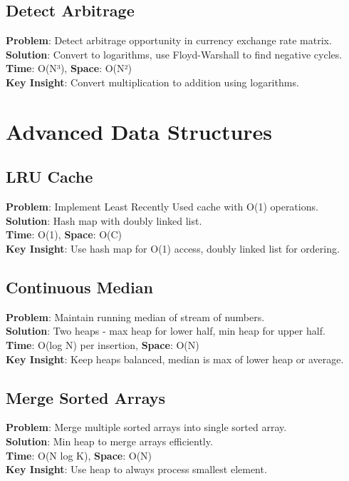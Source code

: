 \documentclass{report}
\begin{document}
\subsection{Detect Arbitrage}
\textbf{Problem}: Detect arbitrage opportunity in currency exchange rate matrix.\\
\textbf{Solution}: Convert to logarithms, use Floyd-Warshall to find negative cycles.\\
\textbf{Time}: O(N³), \textbf{Space}: O(N²)\\
\textbf{Key Insight}: Convert multiplication to addition using logarithms.

\section{Advanced Data Structures}

\subsection{LRU Cache}
\textbf{Problem}: Implement Least Recently Used cache with O(1) operations.\\
\textbf{Solution}: Hash map with doubly linked list.\\
\textbf{Time}: O(1), \textbf{Space}: O(C)\\
\textbf{Key Insight}: Use hash map for O(1) access, doubly linked list for ordering.

\subsection{Continuous Median}
\textbf{Problem}: Maintain running median of stream of numbers.\\
\textbf{Solution}: Two heaps - max heap for lower half, min heap for upper half.\\
\textbf{Time}: O(log N) per insertion, \textbf{Space}: O(N)\\
\textbf{Key Insight}: Keep heaps balanced, median is max of lower heap or average.

\subsection{Merge Sorted Arrays}
\textbf{Problem}: Merge multiple sorted arrays into single sorted array.\\
\textbf{Solution}: Min heap to merge arrays efficiently.\\
\textbf{Time}: O(N log K), \textbf{Space}: O(N)\\
\textbf{Key Insight}: Use heap to always process smallest element.
\end{document}
